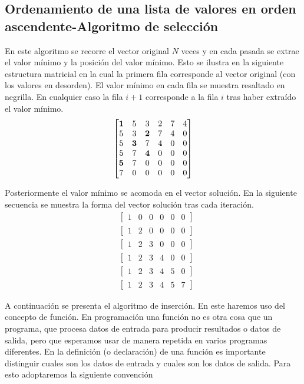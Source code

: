 \subsection{Ordenamiento de una lista de valores en orden ascendente-Algoritmo de selección}
En este algoritmo se recorre el vector original $N$ veces y en cada pasada se extrae el valor mínimo y la posición del valor mínimo. Esto se ilustra en la siguiente estructura matricial en la cual la primera fila corresponde al vector original (con los valores en desorden). El valor mínimo en cada fila se muestra resaltado en negrilla. En cualquier caso la fila $i+1$ corresponde a la fila $i$ tras haber extraído el valor mínimo.
\[\begin{bmatrix}
  \bf{1} &5 &3 &2 &7 &4\\
  5 &3 &\bf{2} &7 &4 &0\\
  5 &\bf{3} &7 &4 &0 &0\\
  5 &7 &\bf{4} &0 &0 &0\\
  \bf{5} &7 &0 &0 &0 &0\\
  7 &0 &0 &0 &0 &0
\end{bmatrix}\]

Posteriormente el valor mínimo se acomoda en el vector solución. En la siguiente secuencia se muestra la forma del vector solución tras cada iteración.
\begin{align*}
&\begin{bmatrix}
  1 &0 &0 &0 &0 &0
\end{bmatrix}\\
&\begin{bmatrix}
  1 &2 &0 &0 &0 &0
\end{bmatrix}\\
&\begin{bmatrix}
  1 &2 &3 &0 &0 &0
\end{bmatrix}\\
&\begin{bmatrix}
  1 &2 &3 &4 &0 &0
\end{bmatrix}\\
&\begin{bmatrix}
  1 &2 &3 &4 &5 &0
\end{bmatrix}\\
&\begin{bmatrix}
 1& 2 &3 &4 &5 &7
\end{bmatrix}
\end{align*}

A continuación se presenta el algoritmo de inserción. En este haremos uso del concepto de función. En programación una función no es otra cosa que un programa, que procesa datos de entrada para producir resultados o datos de salida, pero que esperamos usar de manera repetida en varios programas diferentes. En la definición (o declaración) de una función es importante distinguir cuales son los datos de entrada y cuales son los datos de salida. Para esto adoptaremos la siguiente convención

